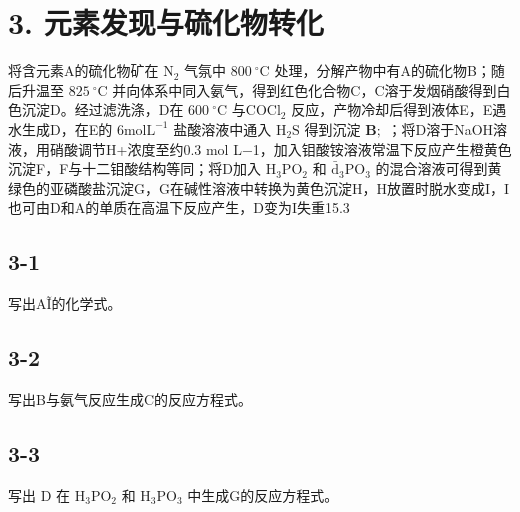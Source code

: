 \section*{3. 元素发现与硫化物转化}
将含元素A的硫化物矿在 $\mathrm { N } _ { 2 }$ ⽓氛中 $8 0 0 ~ ^ { \circ } \mathrm { C }$ 处理，分解产物中有A的硫化物B；随后升温⾄ $8 2 5 ~ ^ { \circ } \mathrm { C }$ 并向体系中同⼊氨⽓，得到红⾊化合物C，C溶于发烟硝酸得到⽩⾊沉淀D。经过滤洗涤，D在 $6 0 0 ~ ^ { \circ } \mathrm { C }$ 与$\mathrm { C O C l } _ { 2 }$ 反应，产物冷却后得到液体E，E遇⽔⽣成D，在E的 $6 \mathrm { m o l } \mathrm { L } ^ { - 1 }$ 盐酸溶液中通⼊ $\mathrm { H } _ { 2 } \mathrm { S }$ 得到沉淀 $\mathbf { B } ;$ ；将D溶于NaOH溶液，⽤硝酸调节H+浓度⾄约0.3 mol L−1，加⼊钼酸铵溶液常温下反应产⽣橙⻩⾊沉淀F，F与⼗⼆钼酸结构等同；将D加⼊ $\mathrm { H } _ { 3 } \mathrm { P O } _ { 2 }$ 和 $\mathrm { { \bar { { d } } _ { 3 } P O _ { 3 } } }$ 的混合溶液可得到⻩绿⾊的亚磷酸盐沉淀G，G在碱性溶液中转换为⻩⾊沉淀H，H放置时脱⽔变成I，I也可由D和A的单质在⾼温下反应产⽣，D变为I失重15.3%

\subsection*{3-1}
写出A\~I的化学式。

\subsection*{3-2}
写出B与氨⽓反应⽣成C的反应⽅程式。

\subsection*{3-3}
写出 D 在 $\mathrm { H } _ { 3 } \mathrm { P O } _ { 2 }$ 和 $\mathrm { H _ { 3 } P O _ { 3 } }$ 中⽣成G的反应⽅程式。
